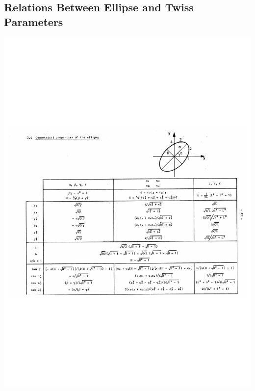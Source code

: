 \documentclass{article}
\begin{document}
\subsection{Relations Between Ellipse and Twiss Parameters}
\includegraphics[width=15cm, trim={0.cm 7.6cm 0.cm 8.cm}, clip]{ellipse.pdf}
\end{document}
